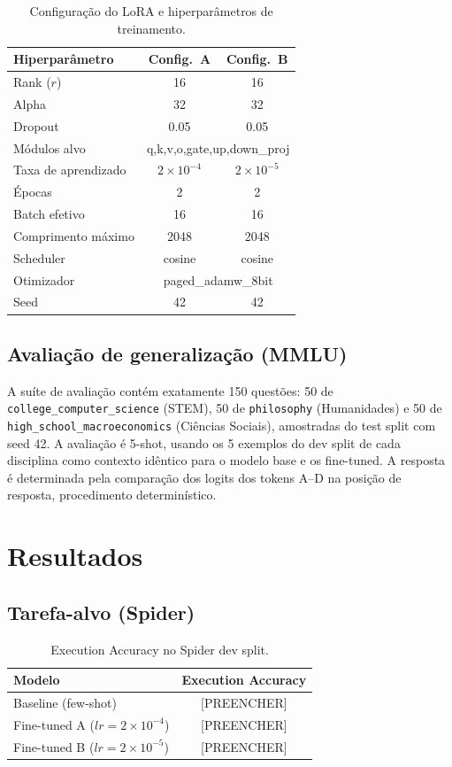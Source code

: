 \documentclass[conference]{IEEEtran}
\begin{document}
\begin{table}[ht]
\centering
\caption{Configuração do LoRA e hiperparâmetros de treinamento.}
\label{tab:lora}
\begin{tabular}{lcc}
\toprule
Hiperparâmetro & Config.\ A & Config.\ B \\
\midrule
Rank ($r$) & 16 & 16 \\
Alpha & 32 & 32 \\
Dropout & 0.05 & 0.05 \\
Módulos alvo & \multicolumn{2}{c}{q,k,v,o,gate,up,down\_proj} \\
Taxa de aprendizado & $2\times10^{-4}$ & $2\times10^{-5}$ \\
Épocas & 2 & 2 \\
Batch efetivo & 16 & 16 \\
Comprimento máximo & 2048 & 2048 \\
Scheduler & cosine & cosine \\
Otimizador & \multicolumn{2}{c}{paged\_adamw\_8bit} \\
Seed & 42 & 42 \\
\bottomrule
\end{tabular}
\end{table}

\subsection{Avaliação de generalização (MMLU)}
A suíte de avaliação contém exatamente 150 questões: 50 de
\texttt{college\_computer\_science} (STEM), 50 de \texttt{philosophy}
(Humanidades) e 50 de \texttt{high\_school\_macroeconomics} (Ciências
Sociais), amostradas do test split com seed 42. A avaliação é 5-shot,
usando os 5 exemplos do dev split de cada disciplina como contexto
idêntico para o modelo base e os fine-tuned. A resposta é determinada
pela comparação dos logits dos tokens A--D na posição de resposta,
procedimento determinístico.

\section{Resultados}

\subsection{Tarefa-alvo (Spider)}

\begin{table}[ht]
\centering
\caption{Execution Accuracy no Spider dev split.}
\label{tab:spider}
\begin{tabular}{lc}
\toprule
Modelo & Execution Accuracy \\
\midrule
Baseline (few-shot) & [PREENCHER] \\
Fine-tuned A ($lr=2\times10^{-4}$) & [PREENCHER] \\
Fine-tuned B ($lr=2\times10^{-5}$) & [PREENCHER] \\
\bottomrule
\end{tabular}
\end{table}
\end{document}
